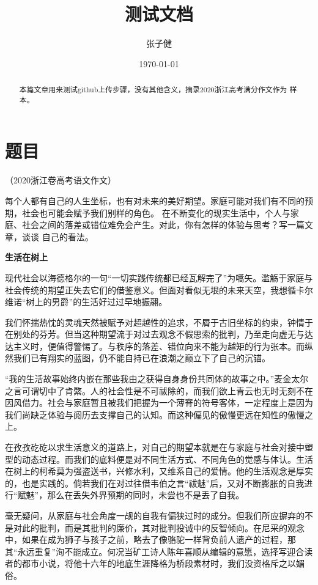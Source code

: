 \documentclass[12pt,a4paper]{article}
\title{测试文档}
\author{张子健}
\date{\today}
\begin{document}
\maketitle

\begin{abstract}
本篇文章用来测试github上传步骤，没有其他含义，摘录2020浙江高考满分作文作为
样本。
\end{abstract}

\section*{题目}
（2020浙江卷高考语文作文）

每个人都有自己的人生坐标，也有对未来的美好期望。家庭可能对我们有不同的预期，社会也可能会赋予我们别样的角色。
在不断变化的现实生活中，个人与家庭、社会之间的落差或错位难免会产生。对此，你有怎样的体验与思考？写一篇文章，谈谈
自己的看法。

\begin{center}
    \textbf{\Large 生活在树上}
\end{center}

现代社会以海德格尔的一句“一切实践传统都已经瓦解完了”为嚆矢。滥觞于家庭与社会传统的期望正失去它们的借鉴意义。但面对看似无垠的未来天空，我想循卡尔维诺“树上的男爵”的生活好过过早地振翮。

我们怀揣热忱的灵魂天然被赋予对超越性的追求，不屑于古旧坐标的约束，钟情于在别处的芬芳。但当这种期望流于对过去观念不假思索的批判，乃至走向虚无与达达主义时，便值得警惕了。与秩序的落差、错位向来不能为越矩的行为张本。而纵然我们已有翔实的蓝图，仍不能自持已在浪潮之巅立下了自己的沉锚。

“我的生活故事始终内嵌在那些我由之获得自身身份共同体的故事之中。”麦金太尔之言可谓切中了肯綮。人的社会性是不可祓除的，而我们欲上青云也无时无刻不在因风借力。社会与家庭暂且被我们把握为一个薄脊的符号客体，一定程度上是因为我们尚缺乏体验与阅历去支撑自己的认知。而这种偏见的傲慢更远在知性的傲慢之上。

在孜孜矻矻以求生活意义的道路上，对自己的期望本就是在与家庭与社会对接中塑型的动态过程。而我们的底料便是对不同生活方式、不同角色的觉感与体认。生活在树上的柯希莫为强盗送书，兴修水利，又维系自己的爱情。他的生活观念是厚实的，也是实践的。倘若我们在对过往借韦伯之言“祓魅”后，又对不断膨胀的自我进行“赋魅”，那么在丢失外界预期的同时，未尝也不是丢了自我。

毫无疑问，从家庭与社会角度一觇的自我有偏狭过时的成分。但我们所应摒弃的不是对此的批判，而是其批判的廉价，其对批判投诚中的反智倾向。在尼采的观念中，如果在成为狮子与孩子之前，略去了像骆驼一样背负前人遗产的过程，那其“永远重复”洵不能成立。何况当矿工诗人陈年喜顺从编辑的意愿，选择写迎合读者的都市小说，将他十六年的地底生涯降格为桥段素材时，我们没资格斥之以媚俗。
\end{document}
